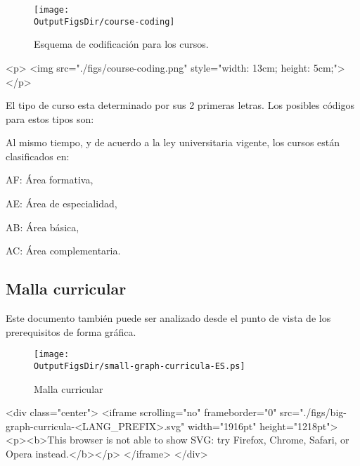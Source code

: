 \begin{btUnit}
\begin{latexonly}
      \begin{figure}[ht]
      \centering
      \texttt{[image: \\OutputFigsDir/course-coding]}
      \caption{Esquema de codificación para los cursos.}\label{fig:course-coding}
      \end{figure}
\end{latexonly}
\begin{htmlonly}
      \begin{rawhtml}
            <p>
                  <img src="./figs/course-coding.png" style="width: 13cm; height: 5cm;">
            </p>
      \end{rawhtml}
\end{htmlonly}

El tipo de curso esta determinado por sus 2 primeras letras. Los posibles códigos para estos tipos son:


Al mismo tiempo, y de acuerdo a la ley universitaria vigente, los cursos están clasificados en:
\begin{inparadesc}
\item [AF:] Área formativa,
\item [AE:] Área de especialidad,
\item [AB:] Área básica,
\item [AC:] Área complementaria.
\end{inparadesc}



\begin{landscape}



\section{Malla curricular}\label{sec:vision-grafica}
\vspace{-0.3cm}
Este documento también puede ser analizado desde el punto de vista 
de los prerequisitos de forma gráfica.

\begin{latexonly}
      \begin{figure}[H]
            \texttt{[image: \\OutputFigsDir/small-graph-curricula-ES.ps]}
            \label{fig:malla-curricular}
            \caption{Malla curricular \SchoolFullName}
      \end{figure}
\end{latexonly}
\begin{htmlonly}
      \begin{rawhtml}
            <div class="center">
                  <iframe scrolling="no" frameborder="0" src="./figs/big-graph-curricula-<LANG_PREFIX>.svg" width="1916pt" height="1218pt">
                  <p><b>This browser is not able to show SVG: try Firefox, Chrome, Safari, or Opera instead.</b></p>
                  </iframe>
            </div>
      \end{rawhtml}
\end{htmlonly}


\end{landscape}
\end{btUnit}
